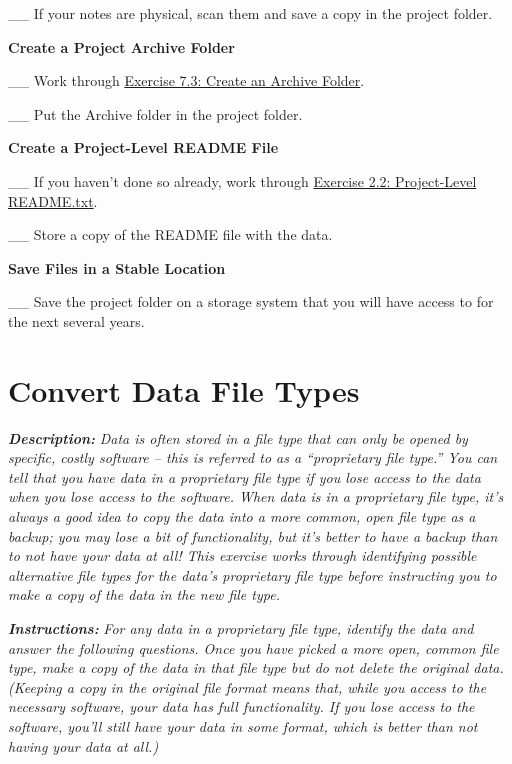 \documentclass[
]{book}
\begin{document}
\_\_ If your notes are physical, scan them and save a copy in the project folder.

\textbf{Create a Project Archive Folder}

\_\_ Work through \protect\hyperlink{archive-folder}{Exercise 7.3: Create an Archive Folder}.

\_\_ Put the Archive folder in the project folder.

\textbf{Create a Project-Level README File}

\_\_ If you haven't done so already, work through \protect\hyperlink{readme-txt}{Exercise 2.2: Project-Level README.txt}.

\_\_ Store a copy of the README file with the data.

\textbf{Save Files in a Stable Location}

\_\_ Save the project folder on a storage system that you will have access to for the next several years.

\hypertarget{file-type}{%
\section{Convert Data File Types}\label{file-type}}

\textbf{\emph{Description:}} \emph{Data is often stored in a file type that can only be opened by specific, costly software -- this is referred to as a ``proprietary file type.'' You can tell that you have data in a proprietary file type if you lose access to the data when you lose access to the software. When data is in a proprietary file type, it's always a good idea to copy the data into a more common, open file type as a backup; you may lose a bit of functionality, but it's better to have a backup than to not have your data at all! This exercise works through identifying possible alternative file types for the data's proprietary file type before instructing you to make a copy of the data in the new file type.}

\textbf{\emph{Instructions:}} \emph{For any data in a proprietary file type, identify the data and answer the following questions. Once you have picked a more open, common file type, make a copy of the data in that file type but do not delete the original data. (Keeping a copy in the original file format means that, while you access to the necessary software, your data has full functionality. If you lose access to the software, you'll still have your data in some format, which is better than not having your data at all.)}
\end{document}
